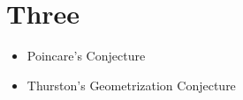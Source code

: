\chapter{Three}

\begin{boxTODO}{}
\begin{itemize}
    \item Poincare's Conjecture
    \item Thurston's Geometrization Conjecture
\end{itemize}
\end{boxTODO}
